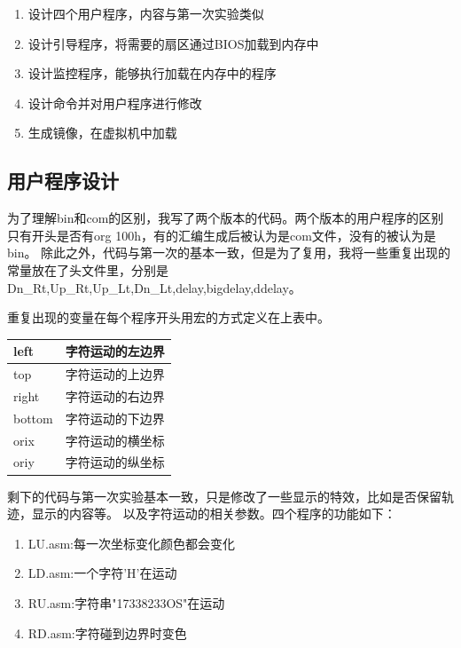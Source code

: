 \documentclass[a4paper, 11pt]{article} %
\begin{document}
\begin{enumerate}
  \item 设计四个用户程序，内容与第一次实验类似
  \item 设计引导程序，将需要的扇区通过BIOS加载到内存中
  \item 设计监控程序，能够执行加载在内存中的程序
  \item 设计命令并对用户程序进行修改
  \item 生成镜像，在虚拟机中加载
\end{enumerate}
\subsection{用户程序设计}

为了理解bin和com的区别，我写了两个版本的代码。两个版本的用户程序的区别只有开头是否有org 100h，有的汇编生成后被认为是com文件，没有的被认为是bin。
除此之外，代码与第一次的基本一致，但是为了复用，我将一些重复出现的常量放在了头文件里，分别是Dn\_Rt,Up\_Rt,Up\_Lt,Dn\_Lt,delay,bigdelay,ddelay。

重复出现的变量在每个程序开头用宏的方式定义在上表中。 

\begin{table}[]
  \begin{tabular}{|l|l|}
    \hline
    \rowcolor[HTML]{FFFFFF} 
    {\color[HTML]{222222} \textbf{left}} & {\color[HTML]{222222} \textbf{字符运动的左边界}} \\ \hline
    top                                  & 字符运动的上边界                                 \\ \hline
    right                                & 字符运动的右边界                                 \\ \hline
    bottom                               & 字符运动的下边界                                 \\ \hline
    orix                                 & 字符运动的横坐标                                 \\ \hline
    oriy                                 & 字符运动的纵坐标                                 \\ \hline
  \end{tabular}
\end{table}

剩下的代码与第一次实验基本一致，只是修改了一些显示的特效，比如是否保留轨迹，显示的内容等。
以及字符运动的相关参数。四个程序的功能如下：
\begin{enumerate}
  \item LU.asm:每一次坐标变化颜色都会变化
  \item LD.asm:一个字符'H'在运动
  \item RU.asm:字符串"17338233OS"在运动
  \item RD.asm:字符碰到边界时变色
\end{enumerate}
\end{document}
